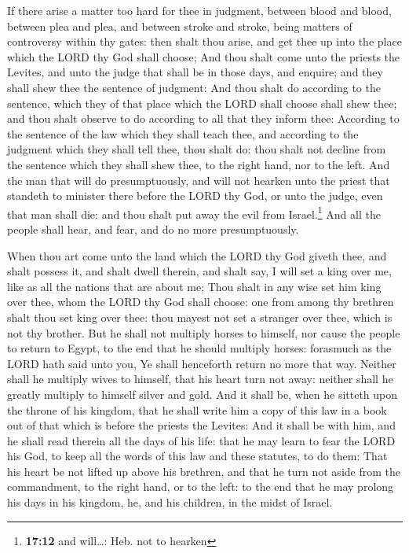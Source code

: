  If there arise a matter too hard for thee in judgment,
between blood and blood, between plea and plea, and between stroke and
stroke, being matters of controversy within thy gates: then shalt thou
arise, and get thee up into the place which the LORD thy God shall
choose;  And thou shalt come unto the priests the Levites,
and unto the judge that shall be in those days, and enquire; and they
shall shew thee the sentence of judgment:  And thou shalt
do according to the sentence, which they of that place which the LORD
shall choose shall shew thee; and thou shalt observe to do according to
all that they inform thee:  According to the sentence of
the law which they shall teach thee, and according to the judgment which
they shall tell thee, thou shalt do: thou shalt not decline from the
sentence which they shall shew thee, to the right hand, nor to the left.
 And the man that will do presumptuously, and will not
hearken unto the priest that standeth to minister there before the LORD
thy God, or unto the judge, even that man shall die: and thou shalt put
away the evil from Israel.\footnote{\textbf{17:12} and will\ldots: Heb.
  not to hearken}  And all the people shall hear, and
fear, and do no more presumptuously.

 When thou art come unto the land which the LORD thy God
giveth thee, and shalt possess it, and shalt dwell therein, and shalt
say, I will set a king over me, like as all the nations that are about
me;  Thou shalt in any wise set him king over thee, whom
the LORD thy God shall choose: one from among thy brethren shalt thou
set king over thee: thou mayest not set a stranger over thee, which is
not thy brother.  But he shall not multiply horses to
himself, nor cause the people to return to Egypt, to the end that he
should multiply horses: forasmuch as the LORD hath said unto you, Ye
shall henceforth return no more that way.  Neither shall
he multiply wives to himself, that his heart turn not away: neither
shall he greatly multiply to himself silver and gold. 
And it shall be, when he sitteth upon the throne of his kingdom, that he
shall write him a copy of this law in a book out of that which is before
the priests the Levites:  And it shall be with him, and
he shall read therein all the days of his life: that he may learn to
fear the LORD his God, to keep all the words of this law and these
statutes, to do them:  That his heart be not lifted up
above his brethren, and that he turn not aside from the commandment, to
the right hand, or to the left: to the end that he may prolong his days
in his kingdom, he, and his children, in the midst of Israel.

